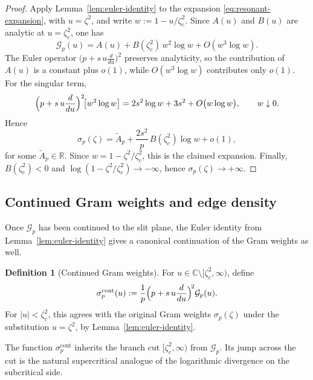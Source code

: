 \documentclass[11pt]{amsart}
\numberwithin{equation}{section}
\theoremstyle{plain}
\theoremstyle{definition}
\newtheorem{definition}[theorem]{Definition}
\theoremstyle{remark}
\newcommand{\CC}{\mathbb{C}}
\begin{document}
\begin{proof}
	Apply Lemma~\ref{lem:euler-identity} to the expansion
	\eqref{eq:resonant-expansion}, with \(u=\zeta^2\), and write $w:=1-u/\zeta_c^2$.
	Since \(A(u)\) and \(B(u)\) are analytic at \(u=\zeta_c^2\), one has
	\[
		\mathcal G_p(u)
		=
		A(u)+B(\zeta_c^2)\,w^2\log w+O(w^3\log w).
	\]
	The Euler operator \(\bigl(p+s\,u\frac{d}{du}\bigr)^2\) preserves analyticity,
	so the contribution of \(A(u)\) is a constant plus \(o(1)\), while
	\(O(w^3\log w)\) contributes only \(o(1)\). For the singular term,
	\begin{equation}\label{eq:Euler-on-w2logw}
		\Bigl(p+s\,u\frac{d}{du}\Bigr)^2\!\bigl[w^2\log w\bigr]
		=
		2s^2\log w+3s^2+O\bigl(w\log w\bigr),
		\qquad w\downarrow0.
	\end{equation}
	Hence
	\[
		\sigma_p(\zeta)
		=
		\widetilde A_p
		+
		\frac{2s^2}{p}\,B(\zeta_c^2)\log w
		+
		o(1),
	\]
	for some \(\widetilde A_p\in\mathbb R\). Since
	\(w=1-\zeta^2/\zeta_c^2\), this is the claimed expansion. Finally,
	\(B(\zeta_c^2)<0\) and \(\log(1-\zeta^2/\zeta_c^2)\to-\infty\), hence
	\(\sigma_p(\zeta)\to+\infty\).
\end{proof}
\subsection{Continued Gram weights and edge density}
\label{subsec:continued-weights}

Once \(\mathcal G_p\) has been continued to the slit plane, the Euler
identity from Lemma~\ref{lem:euler-identity} gives a canonical continuation of
the Gram weights as well.

\begin{definition}[Continued Gram weights]
	\label{def:continued-weights}
	For \(u\in\CC\setminus[\zeta_c^2,\infty)\), define
	\begin{equation}\label{eq:sigma-tilde}
		\sigma_p^{\mathrm{cont}}(u)
		:=
		\frac1p\Bigl(p+s\,u\frac{d}{du}\Bigr)^{\!2}\mathcal G_p(u).
	\end{equation}
	For \(|u|<\zeta_c^2\), this agrees with the original Gram weights
	\(\sigma_p(\zeta)\) under the substitution \(u=\zeta^2\), by
	Lemma~\ref{lem:euler-identity}.
\end{definition}

The function \(\sigma_p^{\mathrm{cont}}\) inherits the branch cut
\([\zeta_c^2,\infty)\) from \(\mathcal G_p\). Its jump across the cut is the
natural supercritical analogue of the logarithmic divergence on the
subcritical side.
\end{document}
